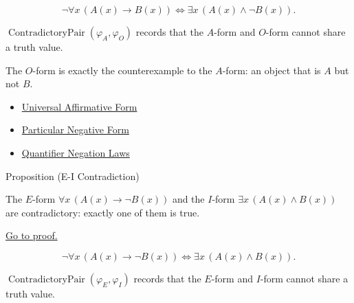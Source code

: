 \begin{remark*}
\[
\neg\forall x\,(A(x)\to B(x))
\Longleftrightarrow
\exists x\,(A(x)\land \neg B(x)).
\]
\end{remark*}

\begin{remark*}
\(\operatorname{ContradictoryPair}(\varphi_A,\varphi_O)\) records that the
\(A\)-form and \(O\)-form cannot share a truth value.
\end{remark*}

\begin{remark*}[Interpretation]
The \(O\)-form is exactly the counterexample to the \(A\)-form: an object that
is \(A\) but not \(B\).
\end{remark*}

\begin{dependencies}
\begin{itemize}
  \item \hyperref[def:categorical-a-form-predicate-logic]{Universal Affirmative Form}
  \item \hyperref[def:categorical-o-form-predicate-logic]{Particular Negative Form}
  \item \hyperref[thm:qneg]{Quantifier Negation Laws}
\end{itemize}
\end{dependencies}

\begin{propositionbox}{Proposition (E-I Contradiction)}
\begin{proposition}[E-I Contradiction]
\label{prop:e-i-contradictory-predicate-logic}
The \(E\)-form \(\forall x\,(A(x)\to \neg B(x))\) and the \(I\)-form
\(\exists x\,(A(x)\land B(x))\) are contradictory: exactly one of them is true.

\noindent\hyperref[prf:e-i-contradictory-predicate-logic]{Go to proof.}
\end{proposition}
\end{propositionbox}

\begin{remark*}
\[
\neg\forall x\,(A(x)\to \neg B(x))
\Longleftrightarrow
\exists x\,(A(x)\land B(x)).
\]
\end{remark*}

\begin{remark*}
\(\operatorname{ContradictoryPair}(\varphi_E,\varphi_I)\) records that the
\(E\)-form and \(I\)-form cannot share a truth value.
\end{remark*}

